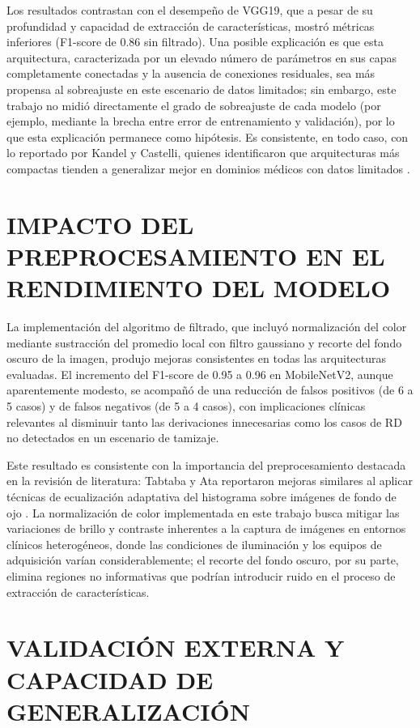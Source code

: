Los resultados contrastan con el desempeño de VGG19, que a pesar de su profundidad y
capacidad de extracción de características, mostró métricas inferiores (F1-score de 0.86
sin filtrado). Una posible explicación es que esta arquitectura, caracterizada por un
elevado número de parámetros en sus capas completamente conectadas y la ausencia de
conexiones residuales, sea más propensa al sobreajuste en este escenario de datos
limitados; sin embargo, este trabajo no midió directamente el grado de sobreajuste de
cada modelo (por ejemplo, mediante la brecha entre error de entrenamiento y validación),
por lo que esta explicación permanece como hipótesis. Es consistente, en todo caso, con
lo reportado por Kandel y Castelli, quienes identificaron que arquitecturas más compactas
tienden a generalizar mejor en dominios médicos con datos limitados
.

\section{IMPACTO DEL PREPROCESAMIENTO EN EL RENDIMIENTO DEL MODELO}

La implementación del algoritmo de filtrado, que incluyó normalización del color mediante
sustracción del promedio local con filtro gaussiano y recorte del fondo oscuro de la
imagen, produjo mejoras consistentes en todas las arquitecturas evaluadas. El incremento
del F1-score de 0.95 a 0.96 en MobileNetV2, aunque aparentemente modesto, se acompañó de
una reducción de falsos positivos (de 6 a 5 casos) y de falsos negativos (de 5 a 4 casos),
con implicaciones clínicas relevantes al disminuir tanto las derivaciones innecesarias
como los casos de RD no detectados en un escenario de tamizaje.

Este resultado es consistente con la importancia del preprocesamiento destacada en la
revisión de literatura: Tabtaba y Ata reportaron mejoras similares al aplicar técnicas de
ecualización adaptativa del histograma sobre imágenes de fondo de ojo
. La normalización de color implementada en este trabajo
busca mitigar las variaciones de brillo y contraste inherentes a la captura de imágenes
en entornos clínicos heterogéneos, donde las condiciones de iluminación y los equipos de
adquisición varían considerablemente; el recorte del fondo oscuro, por su parte, elimina
regiones no informativas que podrían introducir ruido en el proceso de extracción de
características.

\section{VALIDACIÓN EXTERNA Y CAPACIDAD DE GENERALIZACIÓN}

